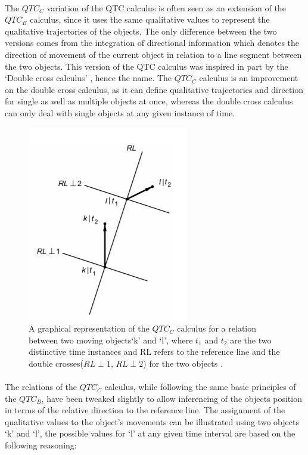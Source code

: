 	\paragraph{}The $QTC_C$ variation of the QTC calculus is often seen as an extension of the $QTC_B$ calculus, since it uses the same qualitative values to represent the qualitative trajectories of the objects. The only difference between the two versions comes from the integration of directional information which denotes the direction of movement of the current object in relation to a line segment between the two objects. This version of the QTC calculus was inspired in part by the `Double cross calculus' \cite{zimmermann1996qualitative}, hence the name. The $QTC_C$ calculus is an improvement on the double cross calculus, as it can define qualitative trajectories and direction for single as well as multiple objects at once, whereas the double cross calculus can only deal with single objects at any given instance of time.
	
	\newpage
	
	\begin{figure}[h!]
		\centering
		\includegraphics[scale=1]{images/QTCC}
		\caption{A graphical representation of the $QTC_C$ calculus for a relation between two moving objects`k' and `l', where $t_1$ and $t_2$ are the two distinctive time instances and RL refers to the reference line and the double crosses($RL\perp1$, $RL\perp2$) for the two objects \cite{van2005qualitative} .}
		\label{fig:qtcc}
	\end{figure}

	\paragraph{}The relations of the $QTC_C$ calculus, while following the same basic principles of the $QTC_B$, have been tweaked slightly to allow inferencing of the objects position in terms of the relative direction to the reference line. The assignment of the qualitative values to the object's movements can be illustrated using two objects `k' and `l', the possible values for `l' at any given time interval are based on the following reasoning:
	
